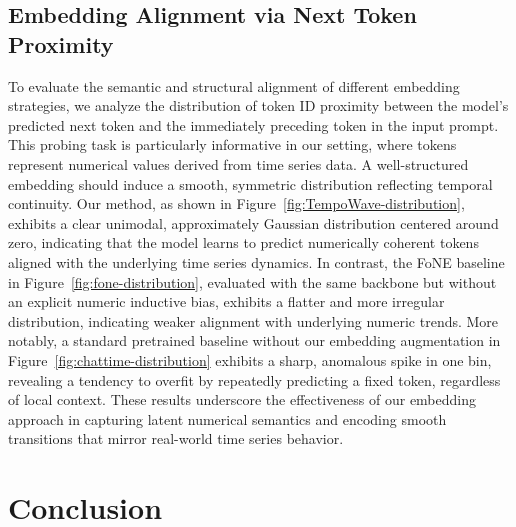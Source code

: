\documentclass{article}
\begin{document}
\subsection{Embedding Alignment via Next Token Proximity}
To evaluate the semantic and structural alignment of different embedding strategies, we analyze the distribution of token ID proximity between the model’s predicted next token and the immediately preceding token in the input prompt. This probing task is particularly informative in our setting, where tokens represent numerical values derived from time series data. A well-structured embedding should induce a smooth, symmetric distribution reflecting temporal continuity. Our method, as shown in Figure~\ref{fig:TempoWave-distribution}, exhibits a clear unimodal, approximately Gaussian distribution centered around zero, indicating that the model learns to predict numerically coherent tokens aligned with the underlying time series dynamics. In contrast, the FoNE baseline in Figure~\ref{fig:fone-distribution}, evaluated with the same backbone but without an explicit numeric inductive bias, exhibits a flatter and more irregular distribution, indicating weaker alignment with underlying numeric trends. More notably, a standard pretrained baseline without our embedding augmentation in Figure~\ref{fig:chattime-distribution} exhibits a sharp, anomalous spike in one bin, revealing a tendency to overfit by repeatedly predicting a fixed token, regardless of local context. These results underscore the effectiveness of our embedding approach in capturing latent numerical semantics and encoding smooth transitions that mirror real-world time series behavior.


\section{Conclusion}
\end{document}
